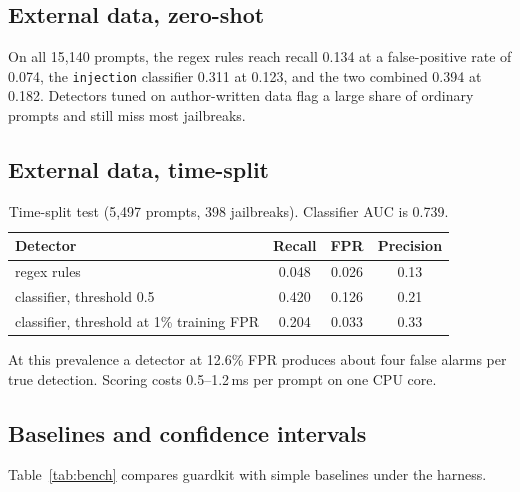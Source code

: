 \documentclass[11pt]{article}
\begin{document}
\subsection{External data, zero-shot}
On all 15,140 prompts, the regex rules reach recall 0.134 at a false-positive rate of 0.074, the \texttt{injection} classifier 0.311 at 0.123, and the two combined 0.394 at 0.182. Detectors tuned on author-written data flag a large share of ordinary prompts and still miss most jailbreaks.

\subsection{External data, time-split}
\begin{table}[h]\centering\small
\begin{tabular}{lccc}\toprule
Detector & Recall & FPR & Precision\\\midrule
regex rules & 0.048 & 0.026 & 0.13\\
classifier, threshold 0.5 & 0.420 & 0.126 & 0.21\\
classifier, threshold at 1\% training FPR & 0.204 & 0.033 & 0.33\\\bottomrule
\end{tabular}
\caption{Time-split test (5,497 prompts, 398 jailbreaks). Classifier AUC is 0.739.}
\end{table}
At this prevalence a detector at 12.6\% FPR produces about four false alarms per true detection. Scoring costs 0.5--1.2\,ms per prompt on one CPU core.

\subsection{Baselines and confidence intervals}\label{sec:bench}
Table~\ref{tab:bench} compares guardkit with simple baselines under the harness.
\end{document}
